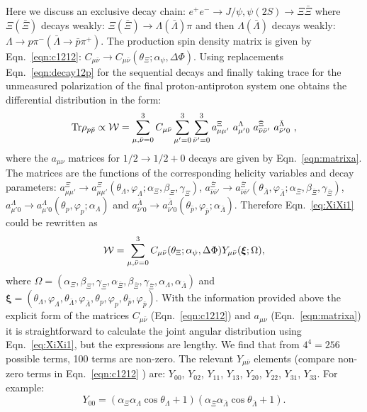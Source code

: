 Here we discuss an exclusive decay chain: $e^+e^-\to J/\psi,\psi(2S)\to\Xi\bar\Xi $ where $\Xi(\bar\Xi)$
decays weakly:
$\Xi(\bar\Xi)\to\Lambda(\bar\Lambda)\pi$ and then $\Lambda(\bar\Lambda)$ decays weakly: $\Lambda\to p\pi^-(\bar\Lambda\to \bar p\pi^+)$.
The production spin density matrix is given by Eqn.~\eqref{eqn:c1212}: $C_{\mu\bar\nu}\to C_{\mu\bar\nu}(\theta_\Xi;\alpha_{\psi},\Delta\Phi)$.
Using replacements Eqn.~\eqref{eqn:decay12p} for the sequential decays
and finally taking trace for the unmeasured polarization 
of the final proton-antiproton system
one obtains the differential distribution in the form: 
\begin{equation}
\mathrm{Tr}\rho_{p\bar{p}}\propto {\cal W}=\sum_{\mu,\bar\nu=0}^3C_{\mu\bar\nu}\sum_{\mu'=0}^3\sum_{\bar\nu'=0}^3
    a_{\mu\mu'}^\Xi\ a_{\mu'0}^\Lambda\ 
    a_{\bar\nu\bar\nu'}^{\bar\Xi}\ a_{\bar\nu'0}^{\bar\Lambda}\ ,\label{eq:XiXi1}
\end{equation}
where the $a_{\mu\nu}$ matrices for $1/2\to 1/2+0$ decays are given by Eqn.~\eqref{eqn:matrixa}. The matrices are the functions of the corresponding 
helicity variables and decay parameters: $a_{\mu\mu'}^\Xi\to a_{\mu\mu'}^\Xi(\theta_\Lambda,\varphi_\Lambda; \alpha_{\Xi},\beta_\Xi,\gamma_\Xi)$,
 $a_{\bar\nu\bar\nu'}^{\bar\Xi}\to a_{\bar\nu\bar\nu'}^{\bar\Xi}(\theta_{\bar\Lambda},\varphi_{\bar\Lambda}; \alpha_{\bar\Xi},\beta_{\bar\Xi},\gamma_{\bar\Xi})$,
$a_{\mu'0}^\Lambda\to a_{\mu'0}^\Lambda(\theta_p,\varphi_p; \alpha_{\Lambda})$ and $a_{\bar\nu'0}^{\bar\Lambda}\to a_{\bar\nu'0}^{\bar\Lambda}(\theta_{\bar p},\varphi_{\bar p}; \alpha_{\bar\Lambda})$.
Therefore Eqn.~\eqref{eq:XiXi1} could be rewritten as
\begin{equation}
  {\cal W}=\sum_{\mu,\bar\nu=0}^3C_{\mu\bar\nu}(\theta_\Xi;\alpha_{\psi},\Delta\Phi)Y_{\mu\bar\nu}(\boldsymbol{\xi};\Omega),  
\end{equation}
where $\Omega=(\alpha_{\Xi},\beta_\Xi,\gamma_\Xi,
\alpha_{\bar\Xi},\beta_{\bar\Xi},\gamma_{\bar\Xi}, \alpha_{\Lambda},
\alpha_{\bar\Lambda})$ and
$\boldsymbol{\xi}=(\theta_\Lambda,\varphi_\Lambda,\theta_{\bar\Lambda},\varphi_{\bar\Lambda},\theta_p,\varphi_p,\theta_{\bar
  p},\varphi_{\bar p})$. With the information provided above the explicit
form of the matrices $C_{\mu\bar\nu}$ (Eqn.~\eqref{eqn:c1212}) and
$a_{\mu\nu}$ (Eqn.~\eqref{eqn:matrixa}) it is straightforward to
calculate the joint angular distribution using Eqn.~\eqref{eq:XiXi1},
but the expressions are lengthy.
We find that from $4^4=256$ possible terms, 100 terms are non-zero.
The relevant $Y_{\mu\bar\nu}$ elements (compare non-zero terms
in Eqn.~\eqref{eqn:c1212} ) are: $Y_{00}$, $Y_{02}$, $Y_{11}$, $Y_{13}$, $Y_{20}$, $Y_{22}$, $Y_{31}$, $Y_{33}$. For example:
\begin{equation*}
Y_{00}=({\alpha_\Xi} {\alpha_\Lambda} \cos {\theta_\Lambda}+1) ({\alpha_{\bar\Xi}} {\alpha_{\bar\Lambda}} \cos{\theta_{\bar\Lambda}}+1)  .
\end{equation*}


